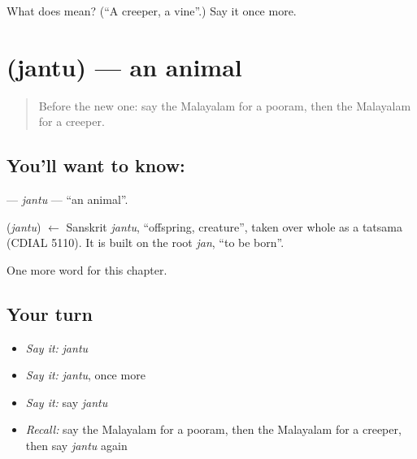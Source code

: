 \begin{tcolorbox}[breakable,colback=teal!4,colframe=teal!35!black,title={Before you move on}]
What does  mean? (\textquotedblleft{}A creeper, a vine\textquotedblright{}.) Say it once more.
\end{tcolorbox}
\section[\texorpdfstring{\ml{ജന്തു} (jantu)}{ജന്തു (jantu)}]{ (jantu) — an animal}

\label{lesson:ML-C291-jantu}



\begin{quote}
Before the new one: say the Malayalam for a pooram, then the Malayalam for a creeper.
\end{quote}

\subsection*{You'll want to know: }
\textbf{} — \emph{jantu} — \textquotedblleft{}an animal\textquotedblright{}.

\begin{cousinweb}
\textbf{} (\emph{jantu}) $\leftarrow$ Sanskrit \emph{jantu}, \textquotedblleft{}offspring, creature\textquotedblright{}, taken over whole as a tatsama (CDIAL 5110). It is built on the root \emph{jan}, \textquotedblleft{}to be born\textquotedblright{}.
\end{cousinweb}

\begin{grammarlens}[title={What you've built}]
One more word for this chapter.
\end{grammarlens}

\subsection*{Your turn}
\begin{itemize}
\raggedright
  \item \emph{Say it:} \emph{jantu}
  \item \emph{Say it:} \emph{jantu}, once more
  \item \emph{Say it:} say \emph{jantu}
  \item \emph{Recall:} say the Malayalam for a pooram, then the Malayalam for a creeper, then say \emph{jantu} again
\end{itemize}

